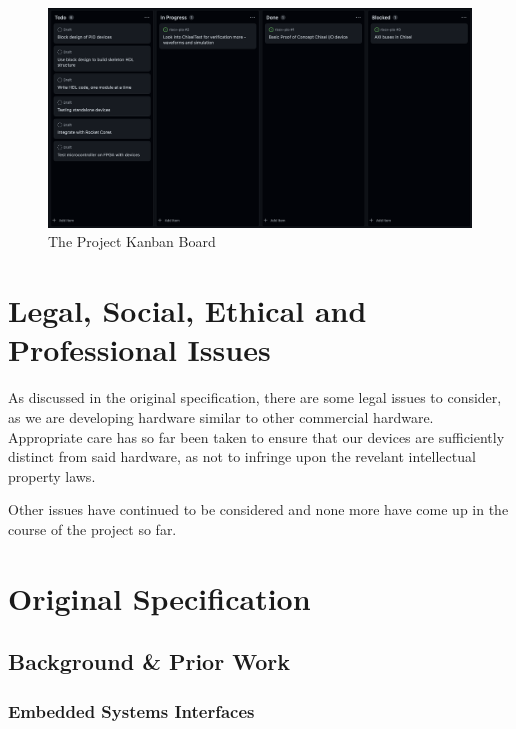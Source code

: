 \documentclass[a4paper,fleqn,12pt]{article}
\begin{document}
\begin{figure}[h!]
	\centering
	\includegraphics[width=\textwidth]{../img/kanban-wk6.png}
	\caption{The Project Kanban Board}
	\label{fig:kanban}
\end{figure}

\section{Legal, Social, Ethical and Professional Issues}

As discussed in the original specification, there are some legal issues to consider, as we are developing hardware similar to other commercial hardware. Appropriate care has so far been taken to ensure that our devices are sufficiently distinct from said hardware, as not to infringe upon the revelant intellectual property laws.

Other issues have continued to be considered and none more have come up in the course of the project so far.

\appendix
\section{Original Specification}

\subsection{Background \& Prior Work}

\subsubsection{Embedded Systems Interfaces}
\end{document}
